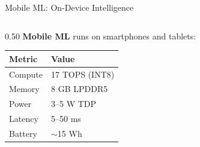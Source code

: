 \documentclass[aspectratio=169, 12pt]{beamer}
\begin{document}
\begin{frame}{Mobile ML: On-Device Intelligence}
\note{
%
%
%
%
%
}

\footnotesize
\begin{columns}[T]
  \begin{column}{0.50\textwidth}
    \textbf{Mobile ML} runs on smartphones and tablets:

    \vspace{0.1cm}
    \renewcommand{\arraystretch}{1.1}
    \begin{tabular}{@{}ll@{}}
      \toprule
      \textbf{Metric} & \textbf{Value} \\
      \midrule
      Compute    & 17 TOPS (INT8) \\
      Memory     & 8 GB LPDDR5 \\
      Power      & 3--5 W TDP \\
      Latency    & 5--50 ms \\
      Battery    & $\sim$15 Wh \\
      \bottomrule
    \end{tabular}


\end{column}
\end{columns}
\end{frame}
\end{document}
